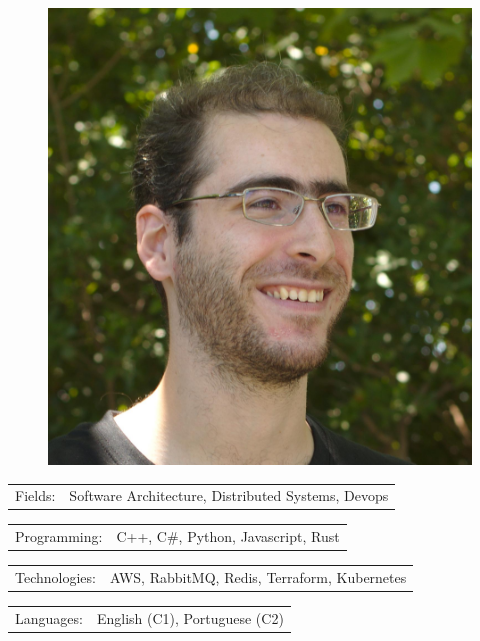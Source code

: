 \documentclass[10pt,A4]{article}
\newcommand{\tzlarrow}{(0,0) -- (0.2,0) -- (0.3,0.2) -- (0.2,0.4) -- (0,0.4) -- (0.1,0.2) -- cycle;}
\newcommand{\larrow}[1]
{\begin{tikzpicture}[scale=0.58]
	 \filldraw[fill=#1!100,draw=#1!100!black]  \tzlarrow
 \end{tikzpicture}
}
\newcommand{\metasection}[2]
{
\begin{tabular*}{1\textwidth}{p{2.6cm} p{11cm}}
\larrow{bgcol}	\normalsize{\textcolor{sectcol}{#1}}&#2\\[6pt]
\end{tabular*}
}
\begin{document}
\pagestyle{fancy}	


\vspace{-20.55pt}

\hspace{-0.25\linewidth}\colorbox{bgcol}{}



\begin{figure}[H]
\begin{flushright}
	\includegraphics[clip,width=0.2\linewidth]{myfoto.jpg}	%
\end{flushright}
\end{figure}



\vspace{-114pt}

\metasection{Fields:}{Software Architecture, Distributed Systems, Devops} 
\metasection{Programming:}{C++, C\#, Python, Javascript, Rust}
\metasection{Technologies:}{AWS, RabbitMQ, Redis, Terraform, Kubernetes}
\metasection{Languages:}{English (C1), Portuguese (C2)}
\end{document}
